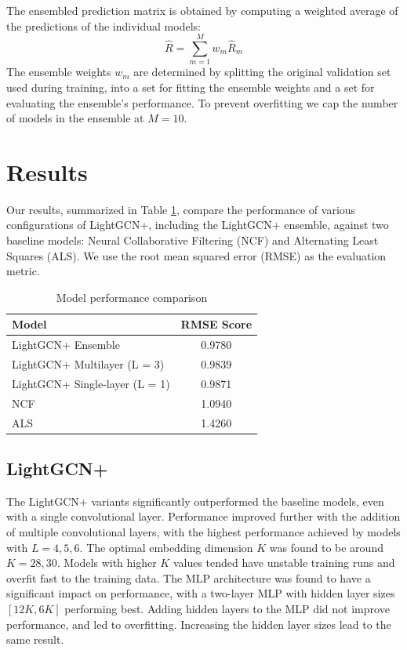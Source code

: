 \documentclass[10pt,conference,compsocconf]{IEEEtran}
\begin{document}
The ensembled prediction matrix is obtained by computing a weighted average of the predictions of the individual models:
\begin{equation}
    \hat{R} = \sum_{m=1}^{M} w_m \hat{R}_m
\end{equation}
The ensemble weights $w_m$ are determined by splitting the original validation set used during training, into a set for fitting the ensemble weights and a set for evaluating the ensemble's performance.
To prevent overfitting we cap the number of models in the ensemble at $M=10$.




\section{Results}
\label{sec:results}

\label{sec:tips-writing}
Our results, summarized in Table \ref{table:results}, compare the performance of various configurations of LightGCN+, including the LightGCN+ ensemble, against two baseline models: Neural Collaborative Filtering (NCF) and Alternating Least Squares (ALS). We use the root mean squared error (RMSE) as the evaluation metric.

\begin{table}[h!]
  \centering
  \begin{tabular}{l c} 
   \hline
   \textbf{Model} & \textbf{RMSE Score} \\ [0.5ex] 
   \hline
   LightGCN+ Ensemble & 0.9780 \\ 
   LightGCN+ Multilayer (L = 3) & 0.9839 \\ 
   LightGCN+ Single-layer (L = 1) & 0.9871 \\ 
   NCF & 1.0940 \\ 
   ALS & 1.4260 \\ 
   \hline
   \end{tabular}
   \caption{Model performance comparison}
   \label{table:results}
  \end{table}
  
\subsection{LightGCN+}
The LightGCN+ variants significantly outperformed the baseline models, even with a single convolutional layer. 
Performance improved further with the addition of multiple convolutional layers, with the highest performance achieved by models with $L=4, 5, 6$.
The optimal embedding dimension $K$ was found to be around $K=28, 30$. Models with higher $K$ values tended have unstable training runs and overfit fast to the training data.
The MLP architecture was found to have a significant impact on performance, with a two-layer MLP with hidden layer sizes $[12K, 6K]$ performing best.
Adding hidden layers to the MLP did not improve performance, and led to overfitting. Increasing the hidden layer sizes lead to the same result.
\end{document}
